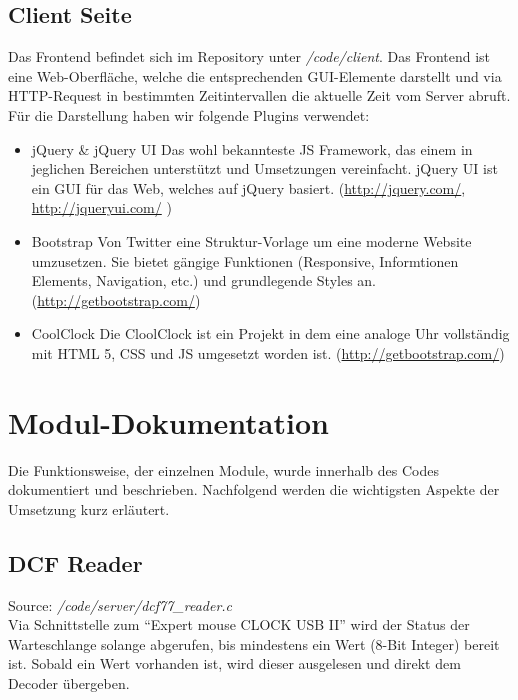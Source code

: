 \subsection{Client Seite}
Das Frontend befindet sich im Repository unter \textit{/code/client}. Das Frontend ist eine Web-Oberfläche, welche die entsprechenden GUI-Elemente darstellt und via HTTP-Request in bestimmten Zeitintervallen die aktuelle Zeit vom Server abruft.\\

Für die Darstellung haben wir folgende Plugins verwendet:
\begin{itemize}
\item jQuery \& jQuery UI
Das wohl bekannteste JS Framework, das einem in jeglichen Bereichen unterstützt und Umsetzungen vereinfacht. jQuery UI ist ein GUI für das Web, welches auf jQuery basiert. (\url{http://jquery.com/}, \url{http://jqueryui.com/} )

\item Bootstrap
Von Twitter eine Struktur-Vorlage um eine moderne Website umzusetzen. Sie bietet gängige Funktionen (Responsive, Informtionen Elements, Navigation, etc.) und grundlegende Styles an. (\url{http://getbootstrap.com/})

\item CoolClock
Die CloolClock ist ein Projekt in dem eine analoge Uhr vollständig mit HTML 5, CSS und JS umgesetzt worden ist. (\url{http://getbootstrap.com/})


\end{itemize}


\section{Modul-Dokumentation}
Die Funktionsweise, der einzelnen Module, wurde innerhalb des Codes dokumentiert und beschrieben. Nachfolgend werden die wichtigsten Aspekte der Umsetzung kurz erläutert.

\subsection{DCF Reader}
Source: \textit{/code/server/dcf77\_reader.c}\\
Via Schnittstelle zum "`Expert mouse CLOCK USB II"' wird der Status der Warteschlange  solange abgerufen, bis mindestens ein Wert (8-Bit Integer) bereit ist.
Sobald ein Wert vorhanden ist, wird dieser ausgelesen und direkt dem Decoder übergeben.

